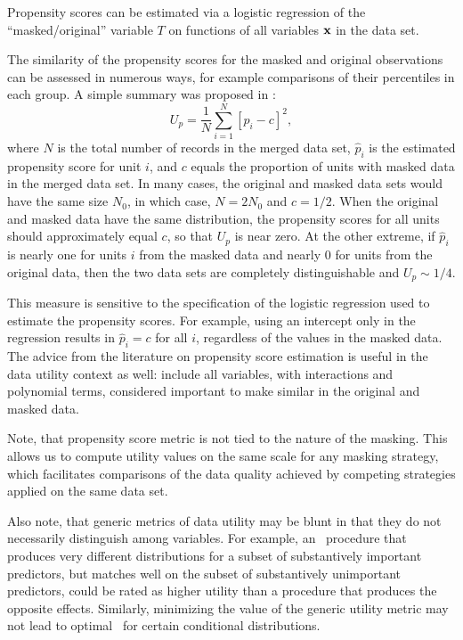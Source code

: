 \documentclass[12pt]{article}
\begin{document}
Propensity scores can be estimated via a logistic regression of the
``masked/original'' variable $T$ on functions of all variables $\textbf{x}$
in the data set.  

The similarity of the propensity scores for the masked and original
observations can be assessed in numerous ways, for example comparisons
of their percentiles in each group.  A simple summary was proposed in \cite{propen}:
\begin{equation}
U_p =  \frac{1}{N} \sum_{i=1}^{N}\left[\hat{p}_i-c\right]^2,
\end{equation}
where $N$ is the total number of records in the merged data set,
$\hat{p}_i$ is the estimated propensity score for unit $i$, and $c$
equals the proportion of units with masked data in the merged data
set. In many cases, the original and masked data sets would have the
same size $N_0$, in which case, $N = 2N_0$ and $c = 1/2$. When the
original and masked data have the same distribution, the propensity
scores for all units should approximately equal $c$, so that $U_p$ is
near zero. At the other extreme, if $\hat{p}_i$ is nearly one for
units $i$ from the masked data and nearly 0 for units from the
original data, then the two data sets are completely distinguishable
and $U_p \sim 1/4$.


This measure is sensitive to the specification of the logistic
regression used to estimate the propensity scores.  For example, using
an intercept only in the regression results in $\hat{p}_i = c$ for all
$i$, regardless of the values in the masked data.  The advice from the
literature on propensity score estimation is
useful in the data utility context as well: include all variables,
with interactions and polynomial terms, considered important to make
similar in the original and masked data.

Note, that propensity score metric is not tied to the nature of the
masking.  This allows us to compute utility values on the same scale
for any masking strategy, which facilitates comparisons of the data
quality achieved by competing strategies applied on the same data
set.

Also note, that generic metrics of data utility may be blunt in that they do not necessarily distinguish among variables. For example, an \SDL\ procedure that produces very different distributions for a subset of substantively important predictors, but matches well on the subset of substantively unimportant predictors, could be rated as higher utility than a procedure that produces the opposite effects.  Similarly, minimizing the value of the generic utility metric may not lead to optimal \DBREL\ for certain conditional distributions.  
\end{document}
